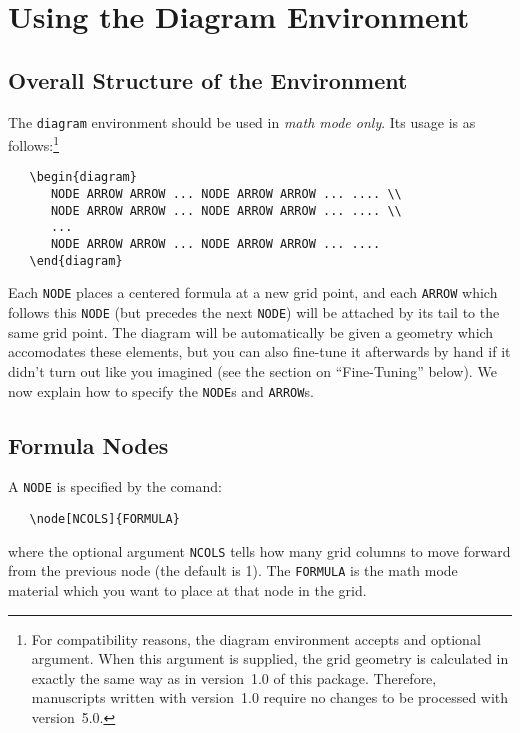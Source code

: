 \documentclass[12pt]{article}\usepackage{pb-diagram}
\def\diagramversion{5.0}
\begin{document}
\pagebreak[4]
\section{Using the Diagram Environment}
\subsection{Overall Structure of the Environment}

The \verb"diagram" environment should be used in
{\em math mode only}.  Its usage is as follows:\footnote{For
compatibility reasons, the diagram environment accepts and
optional argument.  When this argument is supplied, the grid
geometry is calculated in exactly the same way as in version~1.0
of this package. Therefore, manuscripts written with version~1.0
require no changes to be processed with version~\diagramversion.}
\begin{verbatim}
   \begin{diagram}
      NODE ARROW ARROW ... NODE ARROW ARROW ... .... \\
      NODE ARROW ARROW ... NODE ARROW ARROW ... .... \\
      ...
      NODE ARROW ARROW ... NODE ARROW ARROW ... ....
   \end{diagram}
\end{verbatim}

Each \verb"NODE" places a centered formula at a new grid point, and
each \verb"ARROW" which follows this \verb"NODE" (but precedes the 
next \verb"NODE") will be attached by its tail to the same grid 
point. The diagram will be automatically be given a geometry which 
accomodates these elements, but you can also fine-tune it afterwards 
by hand if it didn't turn out like you imagined
(see the section on ``Fine-Tuning'' below).  We now explain
how to specify the \verb"NODE"s and \verb"ARROW"s.

\subsection{Formula Nodes}

A \verb"NODE" is specified by the comand:
\begin{verbatim}
   \node[NCOLS]{FORMULA}
\end{verbatim}
where the optional argument \verb"NCOLS" tells how many grid columns 
to move forward from the previous node (the default is 1).  The 
\verb"FORMULA" is the math mode material which you want to place at 
that node in the grid.
\end{document}
